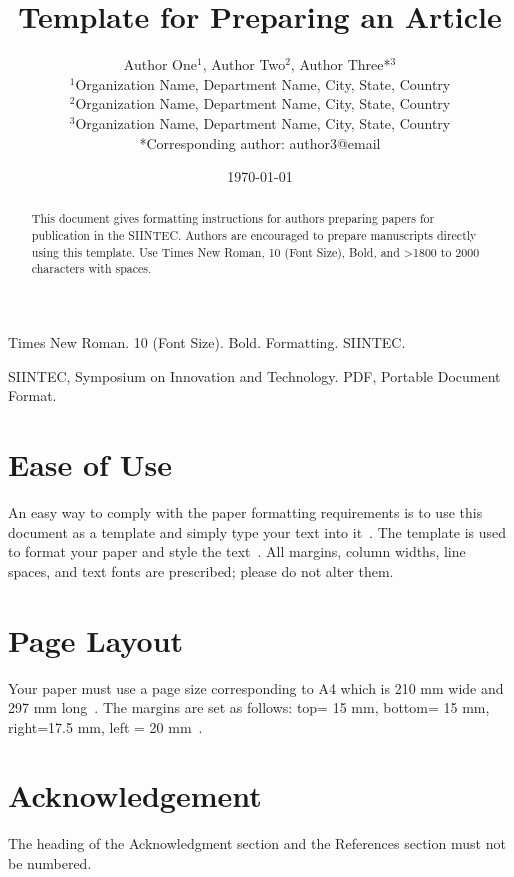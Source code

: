 \documentclass{siintec}
\title{Template for Preparing an Article}
\author{
  Author One$^{1}$, Author Two$^{2}$, Author Three*$^{3}$ \\
  $^{1}$Organization Name, Department Name, City, State, Country \\
  $^{2}$Organization Name, Department Name, City, State, Country \\
  $^{3}$Organization Name, Department Name, City, State, Country \\
  *Corresponding author: author3@email
}
\date{\selectlanguage{brazil}\today}
\begin{document}
\maketitle

\begin{abstract}
This document gives formatting instructions for authors preparing papers for publication in the SIINTEC. Authors are encouraged to prepare manuscripts directly using this template. Use Times New Roman, 10 (Font Size), Bold, and >1800 to 2000 characters with spaces.
\end{abstract}

\begin{keywords}
Times New Roman. 10 (Font Size). Bold. Formatting. SIINTEC.
\end{keywords}

\begin{abbreviations}
SIINTEC, Symposium on Innovation and Technology. PDF, Portable Document Format.
\end{abbreviations}

\doublespacing

\section{Ease of Use}
An easy way to comply with the paper formatting requirements is to use this document as a template and simply type your text into it~\cite{fogg2003}. The template is used to format your paper and style the text~\cite{hirsh2002}. All margins, column widths, line spaces, and text fonts are prescribed; please do not alter them.

\lipsum[1]

\section{Page Layout}
Your paper must use a page size corresponding to A4 which is 210 mm wide and 297 mm long~\cite{hirsh2002}. The margins are set as follows: top= 15 mm, bottom= 15 mm, right=17.5 mm, left = 20 mm~\cite{hirsh2002}.

\lipsum[2-4]

\section*{Acknowledgement}
The heading of the Acknowledgment section and the References section must not be numbered.



\end{document}
